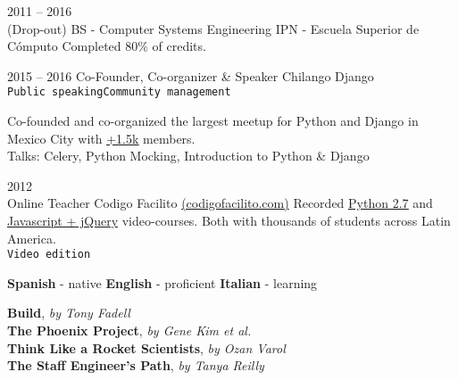 \documentclass[9pt]{developercv} %
\begin{document}

\begin{entrylist}
    \entry
        {
            2011 -- 2016
            \\\footnotesize{(Drop-out)}
        }
        {BS - Computer Systems Engineering}
        {IPN - Escuela Superior de Cómputo}
        {Completed 80\% of credits.}
\end{entrylist}


\begin{entrylist}
    \entry
        {2015 -- 2016}
        {Co-Founder, Co-organizer \& Speaker}
        {
            Chilango Django \\
            \texttt{Public speaking}\slashsep\texttt{Community management}
        }
        {
            
            Co-founded and co-organized the largest meetup for Python and Django in 
            Mexico City with {\href{https://meetup.com/Chilango-Django/}{\underline{+1.5k}}} members. \\

            \small{Talks: Celery, Python Mocking, Introduction to Python \& Django}
            
        }
    \entry
        {2012\\\footnotesize{Online}}
        {Teacher}
        {Codigo Facilito {\href{(https://codigofacilito.com/}{(codigofacilito.com)}}}
        {
            Recorded 
            {\href{https://www.youtube.com/watch?v=CjmzDHMHxwU&list=PLE549A038CF82905F}{\underline{Python 2.7}}} 
            and {\href{https://www.youtube.com/watch?v=jKbjblt4NXA&list=PLpOqH6AE0tNi47LF-_6gddgq10lp_TLDB}{\underline{Javascript + jQuery}}} 
            video-courses. Both with thousands of students across Latin America.\\
            \texttt{Video edition}
        }
\end{entrylist}


\begin{minipage}[t]{1\textwidth}
    \vspace{-\baselineskip} %
    \textbf{Spanish} - native
    \slashsep\textbf{English} - proficient
    \slashsep\textbf{Italian} - learning
\end{minipage}




\begin{minipage}[t]{1\textwidth}
    \vspace{-\baselineskip} %
    \textbf{Build}, \textit{by Tony Fadell} \\
    \textbf{The Phoenix Project}, \textit{by Gene Kim et al.} \\
    \textbf{Think Like a Rocket Scientists}, \textit{by Ozan Varol} \\
    \textbf{The Staff Engineer's Path}, \textit{by Tanya Reilly} \\
\end{minipage}
\end{document}
